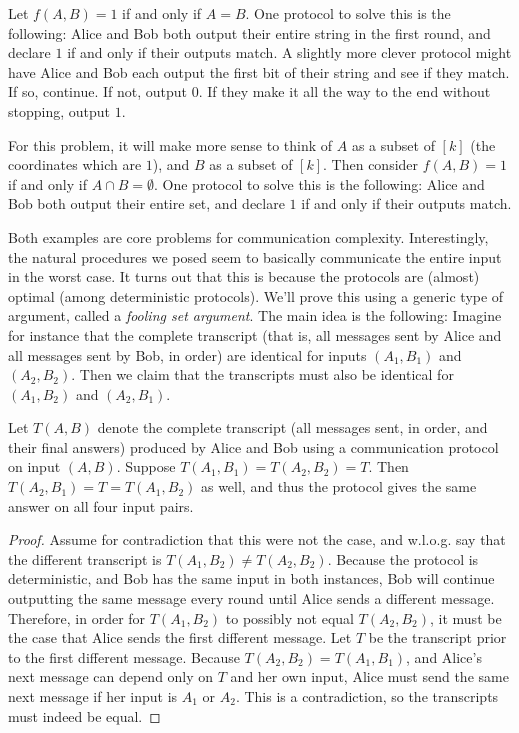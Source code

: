   \begin{Exa}[Equality] 
    Let $f(A, B) = 1$ if and only if $A = B$. One protocol to
    solve this is the following: Alice and Bob both output their entire string in
    the first round, and declare $1$ if and only if their outputs match. A slightly
    more clever protocol might have Alice and Bob each output the first bit of their
    string and see if they match. If so, continue. If not, output $0$. If they make
    it all the way to the end without stopping, output $1$.
  \end{Exa}

  \begin{Exa}[Disjointness] For this problem, it will make more sense to think of
  $A$ as a subset of $[k]$ (the coordinates which are $1$), and $B$ as a subset of
  $[k]$. Then consider $f(A, B) = 1$ if and only if $A \cap B = \emptyset$. One
  protocol to solve this is the following: Alice and Bob both output their entire
  set, and declare $1$ if and only if their outputs match.\end{Exa}

  Both examples are core problems for communication complexity. Interestingly, the
  natural procedures we posed seem to basically communicate the entire input in
  the worst case. It turns out that this is because the protocols are (almost)
  optimal (among deterministic protocols). We'll prove this using a generic type
  of argument, called a \emph{fooling set argument}. The main idea is the
  following: Imagine for instance that the complete transcript (that is, all
  messages sent by Alice and all messages sent by Bob, in order) are identical for
  inputs $(A_1, B_1)$ and $(A_2, B_2)$. Then we claim that the transcripts must
  also be identical for $(A_1, B_2)$ and $(A_2, B_1)$.

  \begin{observation}[Rectangles] 
    Let $T(A, B)$ denote the complete transcript
    (all messages sent, in order, and their final answers) produced by Alice and Bob
    using a communication protocol on input $(A, B)$.
    Suppose $T(A_1, B_1) = T(A_2, B_2) = T$.
    Then $T(A_2, B_1) = T = T(A_1, B_2)$ as well,
    and thus the protocol gives the same answer on all four input pairs.
  \end{observation} 
  \begin{proof} 
    Assume for contradiction that this were not the
    case, and w.l.o.g. say that the different transcript is $T(A_1, B_2) \neq
    T(A_2, B_2)$. Because the protocol is deterministic, and Bob has the same
    input in both instances, Bob will continue outputting the same message every
    round until Alice sends a different message. Therefore, in order for
    $T(A_1, B_2)$ to possibly not equal $T(A_2, B_2)$,
    it must be the case that Alice sends the first different message.
    Let $T$ be the transcript prior to the first different message.
    Because $T(A_2, B_2) = T(A_1, B_1)$, and Alice's next message can
    depend only on $T$ and her own input,
    Alice must send the same next message if her input is $A_1$ or $A_2$.
    This is a contradiction, so the transcripts must indeed be equal.
  \end{proof}

